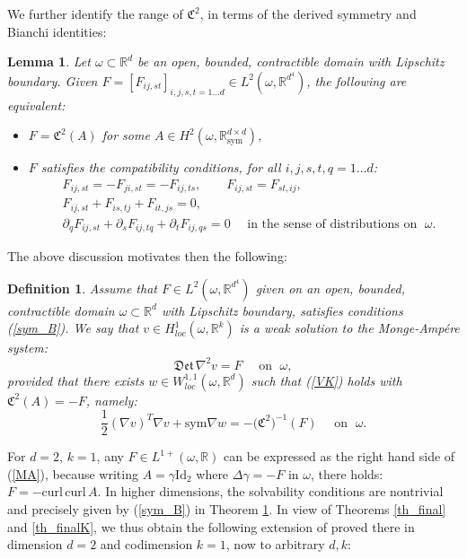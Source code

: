 \documentclass[reqno,twoside,11pt]{amsart}
\newcommand{\sym}{\mathrm{sym}}
\newcommand{\curl}{\mathrm{curl}}
\newcommand{\Id}{\mathrm{Id}}
\newcommand{\R}{\mathbb{R}}
\numberwithin{equation}{section}
\theoremstyle{plain}
\newtheorem{lemma}[theorem]{Lemma}
\newtheorem{definition}[theorem]{Definition}
\theoremstyle{definition}
\begin{document}
\bigskip

\noindent We further identify the range of $\mathfrak{C}^2$, in terms of the derived symmetry and
Bianchi identities:

\begin{lemma}\label{th_solve}
Let $\omega\subset\R^d$ be an open, bounded, contractible domain with
Lipschitz boundary. Given $F=[F_{ij, st}]_{i,j,s,t=1\ldots
  d}\in L^2(\omega, \R^{d^4})$, the following are equivalent:
\begin{itemize}
\item[(i)] $F=\mathfrak{C}^2(A)$ for some $A\in H^{2}(\omega,\R^{d\times d}_\sym)$,
\item[(ii)] $F$ satisfies the compatibility conditions, for all $i,j,s,t,q=1\ldots d$:
\begin{equation}\label{sym_B}
\begin{split}
& F_{ij,st} = - F_{ji,st} = -F_{ij, ts}, \qquad F_{ij, st} = F_{st,ij},
\\ & F_{ij, st}+F_{is,tj} + F_{it,js} = 0, 
\\ & \partial_qF_{ij,st} + \partial_sF_{ij,tq} + \partial_tF_{ij,qs} = 0
\quad \mbox{ in the sense of distributions on }\; \omega. 
\end{split}
\end{equation}
\end{itemize}
\end{lemma}

\smallskip

\noindent The above discussion motivates then the following:

\begin{definition}\label{def_weakMA}
Assume that $F\in L^2(\omega,\R^{d^4})$ given on an open, bounded, contractible domain
$\omega\subset\R^d$ with Lipschitz boundary, satisfies conditions (\ref{sym_B}). We say that
$v\in H^{1}_{loc}(\omega,\R^k)$ is a weak solution to the Monge-Amp\'ere system:
\begin{equation}\label{MAF}
\mathfrak{Det}\,\nabla^2v = F \quad\mbox{ on } \;\omega,
\end{equation}
provided that there exists $w\in W^{1,1}_{loc}(\omega,\R^d)$ such that
(\ref{VK}) holds with $\mathfrak{C}^2(A)= -F$, namely: 
$$\frac{1}{2}(\nabla v)^T\nabla v +\sym\nabla w =
-\big(\mathfrak{C}^2\big)^{-1}(F) \quad\mbox{ on } \;\omega.$$
\end{definition}

\noindent For $d=2$, $k=1$, any $F\in L^{1+}(\omega, \R)$ can be expressed as
the right hand side of (\ref{MA}), because writing $A=\gamma\Id_2$
where $\Delta\gamma = -F$ in $\omega$, there holds: $F=-\curl\,\curl
\,A$. In higher dimensions, the solvability conditions are nontrivial
and precisely given by (\ref{sym_B}) in
Theorem \ref{th_solve}. In view of Theorems \ref{th_final} and \ref{th_finalK}, we thus
obtain the following extension of \cite[Theorem 1.1]{lewpak_MA} 
proved there in dimension $d=2$ and codimension $k=1$, now to arbitrary $d,k$:
\end{document}
